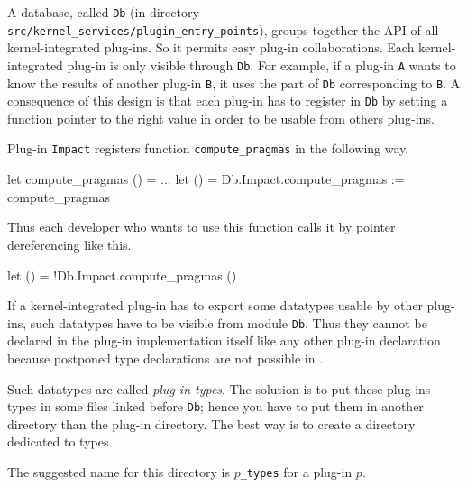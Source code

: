 A database, called \texttt{Db} (in directory
\texttt{src/kernel\_services/plugin\_entry\_points}), groups together
the API of all kernel-integrated
plug-ins. So it permits easy plug-in collaborations. Each kernel-integrated
plug-in is only visible through \texttt{Db}. For example, if a plug-in
\texttt{A} wants to know the results of another plug-in \texttt{B}, it uses the
part of \texttt{Db} corresponding to \texttt{B}. A consequence of this design
is that each plug-in has to register in \texttt{Db} by setting a function
pointer to the right value in order to be usable from others plug-ins.

\begin{example}
Plug-in \texttt{Impact} registers function \texttt{compute\_pragmas} in the
following way.

\begin{ocamlcode}
let compute_pragmas () = ...
let () = Db.Impact.compute_pragmas := compute_pragmas
\end{ocamlcode}
Thus each developer who wants to use this function calls it by pointer
dereferencing like this.
\begin{ocamlcode}
let () = !Db.Impact.compute_pragmas ()
\end{ocamlcode}
\end{example}

If a kernel-integrated plug-in has to export some datatypes usable by other
plug-ins, such datatypes have to be visible from module
\texttt{Db}. Thus they cannot be declared in the plug-in
implementation itself like any other plug-in declaration because postponed type
declarations are not possible in \ocaml.

Such datatypes are called \emph{plug-in types}. The
solution is to put these plug-ins types in some files linked before
\texttt{Db}; hence you have to put them in another directory than the plug-in
directory. The best way is to create a directory dedicated to types.

\begin{convention}
  The suggested name for this directory is
  \texttt{$p$\_types} for a
  plug-in $p$.
\end{convention}


